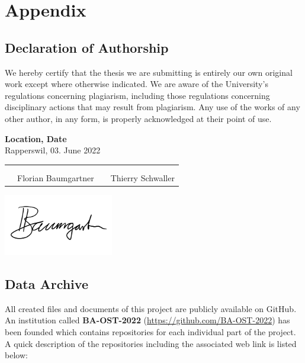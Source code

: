 \chapter{Appendix}
\clearpage

\section{Declaration of Authorship} \label{Declaration of Authorship}
We hereby certify that the thesis we are submitting is entirely our own original work except where otherwise indicated. We are aware of the University’s regulations concerning plagiarism, including those regulations concerning disciplinary actions that may result from plagiarism. Any use of the works of any other author, in any form, is properly acknowledged at their point of use.

\bigskip
\textbf{Location, Date} \\
Rapperswil, 03. June 2022

\vspace{1.2cm}
\begin{tabular}{@{}p{0.1cm}p{6cm}p{0.6cm}p{6cm}@{}}
& \hrulefill & & \hrulefill\\ \\[-0.7em]
& Florian Baumgartner & & Thierry Schwaller\\
\end{tabular}

\includegraphics[width=4.8cm, align=t, smash=br, hshift=0.9cm, vshift=2.55cm]{appendix/Signature_Florian_Baumgartner.pdf}
\newpage

\section{Data Archive} \label{Data Archive}
All created files and documents of this project are publicly available on GitHub. An institution called \textbf{BA-OST-2022} (\url{https://github.com/BA-OST-2022}) has been founded which contains repositories for each individual part of the project.
A quick description of the repositories including the associated web link is listed below:

